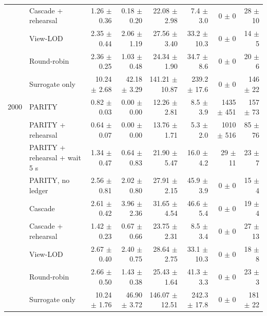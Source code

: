 \begin{table}[t]
\begin{tabular}{llrrrrrr}
 & Cascade + rehearsal & 1.26 $\pm$ 0.36 & 0.18 $\pm$ 0.20 & 22.08 $\pm$ 2.98 & 7.4 $\pm$ 3.0 & 0 $\pm$ 0 & 28 $\pm$ 10 \\
 & View-LOD & 2.35 $\pm$ 0.44 & 2.06 $\pm$ 1.19 & 27.56 $\pm$ 3.40 & 33.2 $\pm$ 10.3 & 0 $\pm$ 0 & 14 $\pm$ 5 \\
 & Round-robin & 2.36 $\pm$ 0.25 & 1.03 $\pm$ 0.48 & 24.34 $\pm$ 1.90 & 34.7 $\pm$ 8.6 & 0 $\pm$ 0 & 20 $\pm$ 6 \\
 & Surrogate only & 10.24 $\pm$ 2.68 & 42.18 $\pm$ 3.29 & 141.21 $\pm$ 10.87 & 239.2 $\pm$ 17.6 & 0 $\pm$ 0 & 146 $\pm$ 22 \\
\midrule
2000 & PARITY & 0.82 $\pm$ 0.03 & 0.00 $\pm$ 0.00 & 12.26 $\pm$ 2.81 & 8.5 $\pm$ 3.9 & 1435 $\pm$ 451 & 157 $\pm$ 73 \\
 & PARITY + rehearsal & 0.64 $\pm$ 0.07 & 0.00 $\pm$ 0.00 & 13.76 $\pm$ 1.71 & 5.3 $\pm$ 2.0 & 1010 $\pm$ 516 & 85 $\pm$ 76 \\
 & PARITY + rehearsal + wait 5 s & 1.34 $\pm$ 0.47 & 0.64 $\pm$ 0.83 & 21.90 $\pm$ 5.47 & 16.0 $\pm$ 4.2 & 29 $\pm$ 11 & 23 $\pm$ 7 \\
 & PARITY, no ledger & 2.56 $\pm$ 0.81 & 2.02 $\pm$ 0.80 & 27.91 $\pm$ 2.15 & 45.9 $\pm$ 3.9 & 0 $\pm$ 0 & 15 $\pm$ 4 \\
 & Cascade & 2.61 $\pm$ 0.42 & 3.96 $\pm$ 2.36 & 31.65 $\pm$ 4.54 & 46.6 $\pm$ 5.4 & 0 $\pm$ 0 & 19 $\pm$ 4 \\
 & Cascade + rehearsal & 1.42 $\pm$ 0.23 & 0.67 $\pm$ 0.66 & 23.75 $\pm$ 2.31 & 8.5 $\pm$ 3.4 & 0 $\pm$ 0 & 27 $\pm$ 13 \\
 & View-LOD & 2.67 $\pm$ 0.40 & 2.40 $\pm$ 0.75 & 28.64 $\pm$ 2.75 & 33.1 $\pm$ 10.3 & 0 $\pm$ 0 & 18 $\pm$ 8 \\
 & Round-robin & 2.66 $\pm$ 0.50 & 1.43 $\pm$ 0.38 & 25.43 $\pm$ 1.64 & 41.3 $\pm$ 3.3 & 0 $\pm$ 0 & 23 $\pm$ 3 \\
 & Surrogate only & 10.24 $\pm$ 1.76 & 46.90 $\pm$ 3.72 & 146.07 $\pm$ 12.51 & 242.3 $\pm$ 17.8 & 0 $\pm$ 0 & 181 $\pm$ 22 \\
\bottomrule
\end{tabular}
\end{table}
